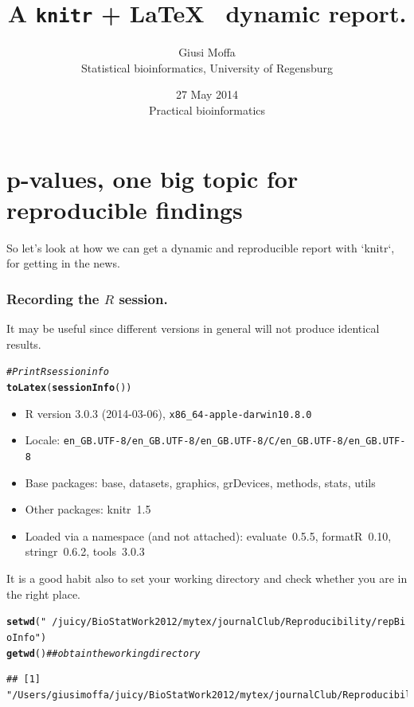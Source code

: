 \documentclass{article}\usepackage[]{graphicx}\usepackage[]{color}
\author{Giusi Moffa \\[2ex] Statistical bioinformatics, University of Regensburg\\[4ex]}
\title{A \texttt{knitr} + \LaTeX~ dynamic report.\\[4ex]}
\date{27 May 2014 \\[4ex] Practical bioinformatics}
\makeatletter
\newcommand{\hlstr}[1]{\textcolor[rgb]{0.192,0.494,0.8}{#1}}%
\newcommand{\hlcom}[1]{\textcolor[rgb]{0.678,0.584,0.686}{\textit{#1}}}%
\newcommand{\hlstd}[1]{\textcolor[rgb]{0.345,0.345,0.345}{#1}}%
\newcommand{\hlkwd}[1]{\textcolor[rgb]{0.737,0.353,0.396}{\textbf{#1}}}%
\newenvironment{kframe}{%
 \def\at@end@of@kframe{}%
 \ifinner\ifhmode%
  \def\at@end@of@kframe{\end{minipage}}%
  \begin{minipage}{\columnwidth}%
 \fi\fi%
 \def\FrameCommand##1{\hskip\@totalleftmargin \hskip-\fboxsep
 \colorbox{shadecolor}{##1}\hskip-\fboxsep
     \hskip-\linewidth \hskip-\@totalleftmargin \hskip\columnwidth}%
 \MakeFramed {\advance\hsize-\width
   \@totalleftmargin\z@ \linewidth\hsize
   \@setminipage}}%
 {\par\unskip\endMakeFramed%
 \at@end@of@kframe}
\newenvironment{knitrout}{}{} %
\makeatother
\begin{document}
\maketitle
\section*{p-values, one big topic for reproducible findings}
So let's look at how we can get a dynamic and reproducible report with `knitr`, for getting in the news.

\subsubsection*{Recording the $R$ session.}
It may be useful since different versions in general will not produce identical results.

\begin{kframe}
\begin{alltt}
\hlcom{# Print R session info}
\hlkwd{toLatex}\hlstd{(}\hlkwd{sessionInfo}\hlstd{())}
\end{alltt}
\end{kframe}\begin{itemize}\raggedright
  \item R version 3.0.3 (2014-03-06), \verb|x86_64-apple-darwin10.8.0|
  \item Locale: \verb|en_GB.UTF-8/en_GB.UTF-8/en_GB.UTF-8/C/en_GB.UTF-8/en_GB.UTF-8|
  \item Base packages: base, datasets, graphics, grDevices,
    methods, stats, utils
  \item Other packages: knitr~1.5
  \item Loaded via a namespace (and not attached): evaluate~0.5.5,
    formatR~0.10, stringr~0.6.2, tools~3.0.3
\end{itemize}



It is a good habit also to set your working directory and check whether you are in the right place.

\begin{knitrout}
\color{fgcolor}\begin{kframe}
\begin{alltt}
\hlkwd{setwd}\hlstd{(}\hlstr{"~/juicy/BioStatWork2012/mytex/journalClub/Reproducibility/repBioInfo"}\hlstd{)}
\hlkwd{getwd}\hlstd{()}  \hlcom{## obtain the working directory}
\end{alltt}
\begin{verbatim}
## [1] "/Users/giusimoffa/juicy/BioStatWork2012/mytex/journalClub/Reproducibility/repBioInfo"
\end{verbatim}
\end{kframe}
\end{knitrout}
\end{document}
